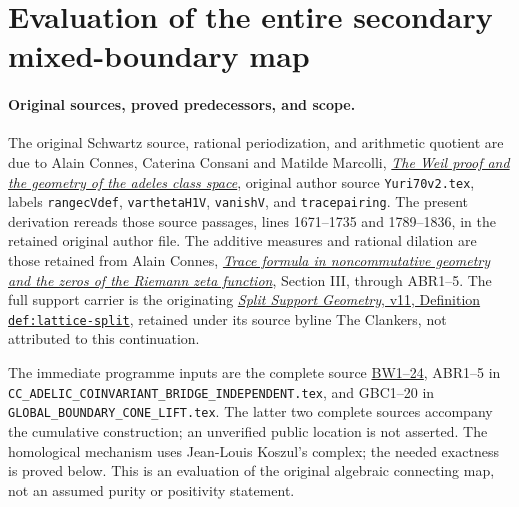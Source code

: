 \section{Evaluation of the entire secondary mixed-boundary map}
\label{sec:global-secondary-boundary-evaluation}

\paragraph{Original sources, proved predecessors, and scope.}
The original Schwartz source, rational periodization, and arithmetic
quotient are due to Alain Connes, Caterina Consani and Matilde Marcolli,
\href{https://arxiv.org/abs/math/0703392v1}{\emph{The Weil proof and
the geometry of the adeles class space}}, original author source
\texttt{Yuri70v2.tex}, labels \texttt{rangecVdef},
\texttt{varthetaH1V}, \texttt{vanishV}, and \texttt{tracepairing}.
The present derivation rereads those source passages, lines 1671--1735
and 1789--1836, in the retained original author file. The additive
measures and rational dilation are those retained from Alain Connes,
\href{https://arxiv.org/abs/math/9811068v1}{\emph{Trace formula in
noncommutative geometry and the zeros of the Riemann zeta function}},
Section III, through ABR1--5. The full support carrier is the originating
\href{https://github.com/KokunoYumeto/zeta-function-research-reader/blob/a2851f9eb352e7e4376bc629de86fa4ed9c1c434/workbenches/splitzero-tandem/foundations/split-support-geometry-v11/split_support_geometry_arithmetic_curve_v11.tex}{\emph{Split Support Geometry}, v11,
Definition \texttt{def:lattice-split}}, retained under its source
byline The Clankers, not attributed to this continuation.

The immediate programme inputs are the complete source
\href{https://github.com/KokunoYumeto/zeta-function-research-reader/blob/e1dc06aa68bb810cf7d8b0006942f5b036b8b765/workbenches/splitzero-tandem/continuations/20260923-retained-source-readers/all-prime-boundary-weights/ROOT_BOUNDARY_WEIGHT_HOMOLOGY.tex}{BW1--24},
ABR1--5 in \nolinkurl{CC_ADELIC_COINVARIANT_BRIDGE_INDEPENDENT.tex},
and GBC1--20 in \nolinkurl{GLOBAL_BOUNDARY_CONE_LIFT.tex}.
The latter two complete sources accompany the cumulative construction;
an unverified public location is not asserted. The homological
mechanism uses Jean-Louis Koszul's complex; the needed exactness is
proved below. This is an evaluation of the original algebraic
connecting map, not an assumed purity or positivity statement.

